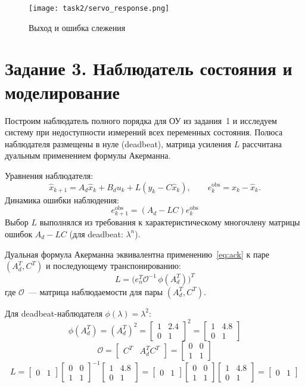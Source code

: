 \begin{figure}[H]
    \centering
    \texttt{[image: task2/servo\_response.png]}
    \caption{Выход и ошибка слежения}
    \label{fig:task2_resp}
\end{figure}

\section{Задание 3. Наблюдатель состояния и моделирование}
Построим наблюдатель полного порядка для ОУ из задания~1 и исследуем систему при недоступности измерений всех переменных состояния. Полюса наблюдателя размещены в нуле (deadbeat), матрица усиления $L$ рассчитана дуальным применением формулы Акерманна.

Уравнения наблюдателя:
\[
 \hat x_{k+1}=A_d \hat x_k + B_d u_k + L( y_k - C\hat x_k ),\qquad 
 e_k^{\text{obs}}=x_k-\hat x_k.
\]
Динамика ошибки наблюдения:
\[
e_{k+1}^{\text{obs}} = (A_d - LC) e_k^{\text{obs}}
\]
Выбор $L$ выполнялся из требования к характеристическому многочлену матрицы ошибок $A_d-LC$ (для deadbeat: $\lambda^n$). 

Дуальная формула Акерманна эквивалентна применению~\eqref{eq:ack} к паре $(A_d^T,C^T)$ и последующему транспонированию: 
\[
L=\bigl(e_n^T \mathcal O^{-1}\, \phi(A_d^T)\bigr)^T
\]
где $\mathcal O$~--- матрица наблюдаемости для пары $(A_d^T,C^T)$.

Для deadbeat-наблюдателя $\phi(\lambda)=\lambda^2$:
\[
\phi(A_d^T) = (A_d^T)^2 = \begin{bmatrix}1 & 2.4\\ 0 & 1\end{bmatrix}^2 = \begin{bmatrix}1 & 4.8\\ 0 & 1\end{bmatrix}
\]
\[
\mathcal O = \begin{bmatrix}C^T & A_d^T C^T\end{bmatrix} = \begin{bmatrix}0 & 0\\ 1 & 1\end{bmatrix}
\]
\[
L = \begin{bmatrix}0 & 1\end{bmatrix} \begin{bmatrix}0 & 0\\ 1 & 1\end{bmatrix}^{-1} \begin{bmatrix}1 & 4.8\\ 0 & 1\end{bmatrix} = \begin{bmatrix}0 & 1\end{bmatrix} \begin{bmatrix}0 & 0\\ 1 & 1\end{bmatrix} \begin{bmatrix}1 & 4.8\\ 0 & 1\end{bmatrix} = \begin{bmatrix}0 & 1\end{bmatrix}
\]

